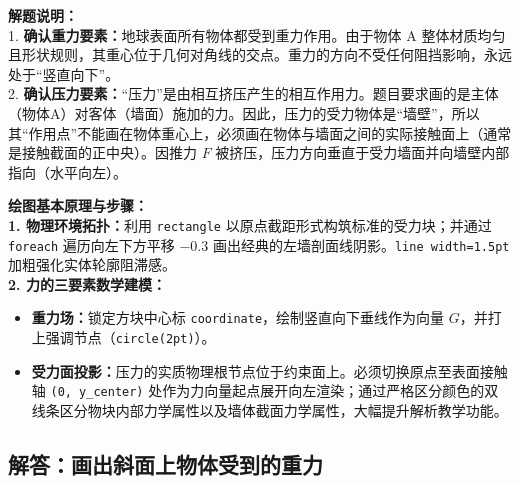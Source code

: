 \vspace{0.6cm}

{\small\color{gray}
\textbf{解题说明：}\\
1. \textbf{确认重力要素：}地球表面所有物体都受到重力作用。由于物体 A 整体材质均匀且形状规则，其重心位于几何对角线的交点。重力的方向不受任何阻挡影响，永远处于“竖直向下”。\\
2. \textbf{确认压力要素：}“压力”是由相互挤压产生的相互作用力。题目要求画的是主体（物体A）对客体（墙面）施加的力。因此，压力的受力物体是“墙壁”，所以其“作用点”不能画在物体重心上，必须画在物体与墙面之间的实际接触面上（通常是接触截面的正中央）。因推力 $F$ 被挤压，压力方向垂直于受力墙面并向墙壁内部指向（水平向左）。
}

\vspace{0.6cm}

{\small\color{blue!70!black}
\textbf{绘图基本原理与步骤：}\\
\textbf{1. 物理环境拓扑：}利用 \texttt{rectangle} 以原点截距形式构筑标准的受力块；并通过 \texttt{foreach} 遍历向左下方平移 $-0.3$ 画出经典的左墙剖面线阴影。\texttt{line width=1.5pt} 加粗强化实体轮廓阻滞感。\\
\textbf{2. 力的三要素数学建模：}
\begin{itemize}
    \item \textbf{重力场：}锁定方块中心标 \texttt{coordinate}，绘制竖直向下垂线作为向量 $G$，并打上强调节点（\texttt{circle(2pt)}）。
    \item \textbf{受力面投影：}压力的实质物理根节点位于约束面上。必须切换原点至表面接触轴 \texttt{(0, y\_center)} 处作为力向量起点展开向左渲染；通过严格区分颜色的双线条区分物块内部力学属性以及墙体截面力学属性，大幅提升解析教学功能。
\end{itemize}
}



\newpage

\subsection{解答：画出斜面上物体受到的重力}

\vspace{0.6cm}

